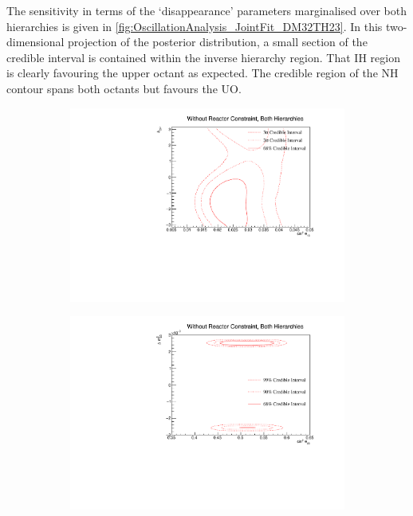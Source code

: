 The sensitivity in terms of the `disappearance' parameters marginalised over both hierarchies is given in \autoref{fig:OscillationAnalysis_JointFit_DM32TH23}. In this two-dimensional projection of the posterior distribution, a small section of the \quickmath{1\sigma} credible interval is contained within the inverse hierarchy region. That IH region is clearly favouring the upper octant as expected. The \quickmath{1\sigma} credible region of the NH contour spans both octants but favours the UO.

\begin{figure}[h]
  \begin{subfigure}[t]{0.95\textwidth}
    \includegraphics[width=\textwidth, trim={0mm 0mm 0mm 0mm}, clip,page=1]{Figures/OA/JointFit/Contours_2D_th13_dcp_BH_1_woRC_UnSmeared_CredibleInterval.pdf}
  \end{subfigure}
  \caption{}
  \label{fig:OscillationAnalysis_JointFit_DCPTH13}
\end{figure}

\begin{figure}[h]
  \begin{subfigure}[t]{0.95\textwidth}
    \includegraphics[width=\textwidth, trim={0mm 0mm 0mm 0mm}, clip,page=1]{Figures/OA/JointFit/Contours_2D_th23_dm32_BH_0_woRC_UnSmeared_CredibleInterval.pdf}
  \end{subfigure}
  \caption{}
  \label{fig:OscillationAnalysis_JointFit_DM32TH23}
\end{figure}

